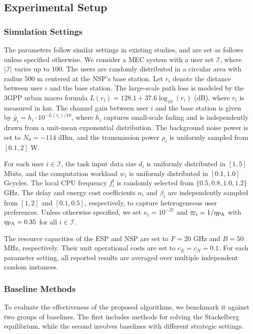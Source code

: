 \documentclass[lettersize,journal]{IEEEtran}
\begin{document}
\subsection{Experimental Setup}\label{subsec:exp_setup}

\subsubsection{Simulation Settings}
The parameters follow similar settings in existing studies\cite{tutuncuoglu2024joint,tong2024stackelberg,chu2024joint}, and are set as follows unless specified otherwise. We consider a MEC system with a user set $\mathcal{I}$, where $|\mathcal{I}|$ varies up to $100$.
The users are randomly distributed in a circular area with radius $500$ m centered at the NSP's base station.
Let $r_i$ denote the distance between user $i$ and the base station.
The large-scale path loss is modeled by the 3GPP urban macro formula
$L(r_i)=128.1+37.6\log_{10}(r_i)$ (dB), where $r_i$ is measured in km.
The channel gain between user $i$ and the base station is given by
$\hat g_i=h_i\cdot 10^{-L(r_i)/10}$,
where $h_i$ captures small-scale fading and is independently drawn from a unit-mean exponential distribution.
The background noise power is set to $N_0=-114$ dBm, and the transmission power $\rho_i$ is uniformly sampled from $[0.1,2]$ W.

For each user $i\in\mathcal{I}$, the task input data size $d_i$ is uniformly distributed in $[1,5]$ Mbits, and the computation workload $w_i$ is uniformly distributed in $[0.1,1.0]$ Gcycles.
The local CPU frequency $f_i^l$ is randomly selected from $\{0.5,0.8,1.0,1.2\}$ GHz.
The delay and energy cost coefficients $\alpha_i$ and $\beta_i$ are independently sampled from $[1,2]$ and $[0.1,0.5]$, respectively, to capture heterogeneous user preferences.
Unless otherwise specified, we set $\kappa_i=10^{-27}$ and $\varpi_i = 1/\eta_{\rm PA}$ with $\eta_{\rm PA}=0.35$ for all $i\in\mathcal{I}$.

The resource capacities of the ESP and NSP are set to $F=20$ GHz and $B=50$ MHz, respectively.
Their unit operational costs are set to $c_E=c_N=0.1$.
For each parameter setting, all reported results are averaged over multiple independent random instances.

\subsubsection{Baseline Methods}
To evaluate the effectiveness of the proposed algorithms, we benchmark it against two groups of baselines. The first includes methods for solving the Stackelberg equilibrium, while the second involves baselines with different strategic settings.
\end{document}
